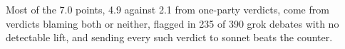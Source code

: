 Most of the 7.0 points, 4.9 against 2.1 from one-party verdicts, come from
verdicts blaming both or neither, flagged in 235 of 390 grok debates with no
detectable lift, and sending every such verdict to sonnet beats the counter.
